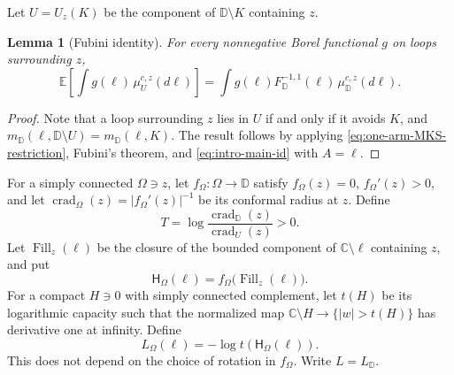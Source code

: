 \documentclass[11pt]{article}
\numberwithin{equation}{section}
\newcommand{\D}{\mathbb{D}}
\newcommand{\C}{\mathbb{C}}
\newcommand{\E}{\mathbb{E}}
\newcommand{\1}{\mathbf{1}}
\newtheorem{lemma}[theorem]{Lemma}
\begin{document}
Let \(U=U_z(K)\) be the component of \(\D\setminus K\) containing \(z\).
\begin{lemma}[Fubini identity]\label{lem:one-arm-fubini}
For every nonnegative Borel functional \(g\) on loops surrounding \(z\),
\begin{equation*}
 \E\!\left[\int g(\ell)\,\mu_U^{c,z}(d\ell)\right]
 =\int g(\ell)F_\D^{-1,1}(\ell)\,\mu_\D^{c,z}(d\ell).
\end{equation*}
\end{lemma}

\begin{proof}
Note that a loop surrounding
\(z\) lies in \(U\) if and only if it avoids \(K\), and \(m_\D(\ell,\D\setminus U)=m_\D(\ell,K)\). The result follows by applying
\eqref{eq:one-arm-MKS-restriction}, Fubini's theorem, and
\eqref{eq:intro-main-id} with \(A=\ell\).
\end{proof}

For a simply connected \(\Omega\ni z\),
let \(f_\Omega:\Omega\to\D\) satisfy \(f_\Omega(z)=0\), \(f_\Omega'(z)>0\), and let
\(\operatorname{crad}_\Omega(z)=|f_\Omega'(z)|^{-1}\) be its conformal radius at \(z\). Define
\begin{equation*}
 T=\log\frac{\operatorname{crad}_\D(z)}
                  {\operatorname{crad}_U(z)}>0.
\end{equation*}
Let
\(\operatorname{Fill}_z(\ell)\) be the closure of the bounded component
of \(\C\setminus\ell\) containing \(z\), and put
\[
 \mathsf H_\Omega(\ell)=f_\Omega\bigl(\operatorname{Fill}_z(\ell)\bigr).
\]
For a compact \(H\ni0\) with simply connected complement, let \(t(H)\) be its logarithmic capacity such that the normalized map \(\C\setminus H\to
\{|w|>t(H)\}\) has derivative one at infinity.  Define
\begin{equation*}
 L_\Omega(\ell)=-\log t(\mathsf H_\Omega(\ell)).
\end{equation*}
This does not depend on the choice of rotation in \(f_\Omega\).
Write \(L=L_\D\).
\end{document}
